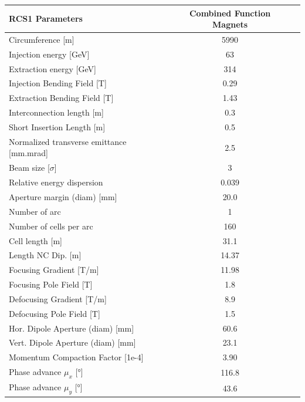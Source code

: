 \begin{tabular}{lcc}
\toprule
RCS1 Parameters & Combined Function Magnets \\
\midrule
Circumference [m] & 5990 \\
Injection energy [GeV] & 63 \\
Extraction energy [GeV] & 314 \\
Injection Bending Field [T] & 0.29 \\
Extraction Bending Field [T] & 1.43 \\
Interconnection length [m] & 0.3 \\
Short Insertion Length  [m] & 0.5 \\
Normalized transverse emittance [mm.mrad] & 2.5 \\
Beam size [$\sigma$] & 3 \\
Relative energy dispersion & 0.039 \\
Aperture margin (diam) [mm] & 20.0 \\
Number of arc & 1 \\
Number of cells per arc & 160 \\
Cell length [m] & 31.1 \\
Length NC Dip. [m] & 14.37 \\
Focusing Gradient [T/m] & 11.98 \\
Focusing Pole Field [T] & 1.8 \\
Defocusing Gradient [T/m] & 8.9 \\
Defocusing Pole Field [T] & 1.5 \\
Hor. Dipole Aperture (diam) [mm] & 60.6 \\
Vert. Dipole Aperture (diam) [mm] & 23.1 \\
Momentum Compaction Factor [1e-4] & 3.90 \\
Phase advance $\mu_x$ [°] & 116.8 \\
Phase advance $\mu_y$ [°] & 43.6 \\
\bottomrule
\end{tabular}
